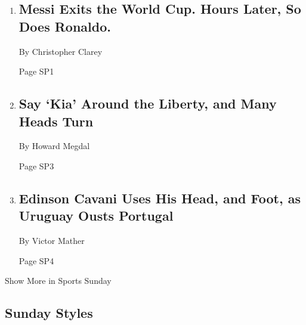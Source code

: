 \begin{enumerate}
\def\labelenumi{\arabic{enumi}.}
\item
  \href{/2018/06/30/sports/world-cup/argentina-vs-france.html}{}

  \hypertarget{messi-exits-the-world-cup-hours-later-so-does-ronaldo-1}{%
  \subsection{Messi Exits the World Cup. Hours Later, So Does
  Ronaldo.}\label{messi-exits-the-world-cup-hours-later-so-does-ronaldo-1}}

  By Christopher Clarey

  Page SP1
\item
  \href{/2018/06/28/sports/wnba-new-york-liberty-kia.html}{}

  \hypertarget{say-kia-around-the-liberty-and-many-heads-turn}{%
  \subsection{Say `Kia' Around the Liberty, and Many Heads
  Turn}\label{say-kia-around-the-liberty-and-many-heads-turn}}

  By Howard Megdal

  Page SP3
\item
  \href{/2018/06/30/sports/world-cup/portugal-vs-uruguay-ronaldo.html}{}

  \hypertarget{edinson-cavani-uses-his-head-and-foot-as-uruguay-ousts-portugal}{%
  \subsection{Edinson Cavani Uses His Head, and Foot, as Uruguay Ousts
  Portugal}\label{edinson-cavani-uses-his-head-and-foot-as-uruguay-ousts-portugal}}

  By Victor Mather

  Page SP4
\end{enumerate}

Show More in Sports Sunday

\hypertarget{sunday-styles}{%
\subsection{Sunday Styles}\label{sunday-styles}}

